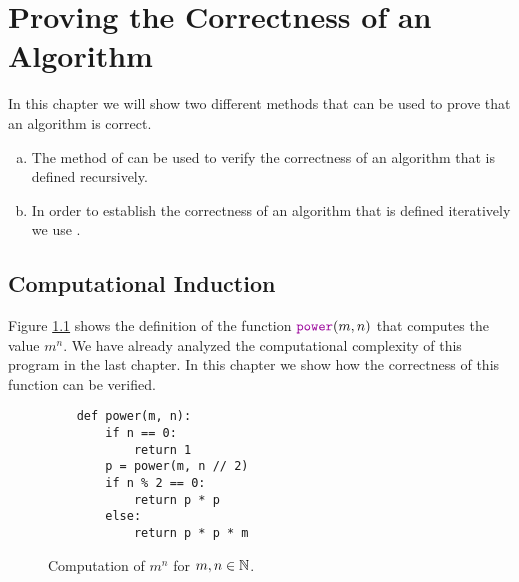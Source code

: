 \chapter{Proving the Correctness of an Algorithm}
In this chapter we will show two different methods that can be used to prove that an algorithm is correct.
\begin{enumerate}[(a)]
\item The method of  can be used to verify the correctness of an algorithm that
      is defined recursively.
\item In order to establish the correctness of an algorithm that is defined iteratively we use . 
\end{enumerate}

\section{Computational Induction}
Figure \ref{fig:power.py} shows the definition of the function $\mytt{power}(m,n)$ that computes
the value $m^n$.  We have already analyzed the computational complexity of this program in the last chapter.
In this chapter we show how the correctness of this function can be verified.

\begin{figure}[!h]
  \centering
\begin{verbatim}
    def power(m, n):
        if n == 0:
            return 1
        p = power(m, n // 2)
        if n % 2 == 0:
            return p * p
        else:
            return p * p * m
\end{verbatim}
\vspace*{-0.3cm}
  \caption{Computation of $m^n$ for $m,n \in {\mathbb N}$.}
  \label{fig:power.py}
\end{figure} 

